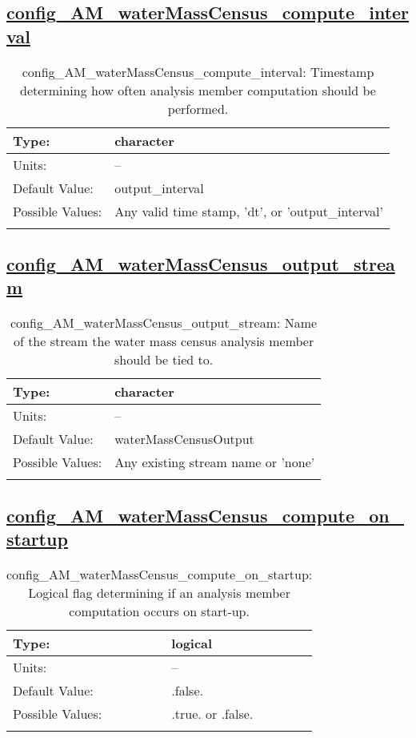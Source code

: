 \subsection[config\_AM\_waterMassCensus\_compute\_interval]{\hyperref[sec:nm_tab_AM_waterMassCensus]{config\_AM\_waterMassCensus\_compute\_interval}}
\label{subsec:nm_sec_config_AM_waterMassCensus_compute_interval}
\begin{center}
\begin{longtable}{| p{2.0in} || p{4.0in} |}
    \hline
    Type: & character \\
    \hline
    Units: & -- \\
    \hline
    Default Value: & output\_interval \\
    \hline
    Possible Values: & Any valid time stamp, 'dt', or 'output\_interval' \\
    \hline
    \caption{config\_AM\_waterMassCensus\_compute\_interval: Timestamp determining how often analysis member computation should be performed.}
\end{longtable}
\end{center}
\subsection[config\_AM\_waterMassCensus\_output\_stream]{\hyperref[sec:nm_tab_AM_waterMassCensus]{config\_AM\_waterMassCensus\_output\_stream}}
\label{subsec:nm_sec_config_AM_waterMassCensus_output_stream}
\begin{center}
\begin{longtable}{| p{2.0in} || p{4.0in} |}
    \hline
    Type: & character \\
    \hline
    Units: & -- \\
    \hline
    Default Value: & waterMassCensusOutput \\
    \hline
    Possible Values: & Any existing stream name or 'none' \\
    \hline
    \caption{config\_AM\_waterMassCensus\_output\_stream: Name of the stream the water mass census analysis member should be tied to.}
\end{longtable}
\end{center}
\subsection[config\_AM\_waterMassCensus\_compute\_on\_startup]{\hyperref[sec:nm_tab_AM_waterMassCensus]{config\_AM\_waterMassCensus\_compute\_on\_startup}}
\label{subsec:nm_sec_config_AM_waterMassCensus_compute_on_startup}
\begin{center}
\begin{longtable}{| p{2.0in} || p{4.0in} |}
    \hline
    Type: & logical \\
    \hline
    Units: & -- \\
    \hline
    Default Value: & .false. \\
    \hline
    Possible Values: & .true. or .false. \\
    \hline
    \caption{config\_AM\_waterMassCensus\_compute\_on\_startup: Logical flag determining if an analysis member computation occurs on start-up.}
\end{longtable}
\end{center}
